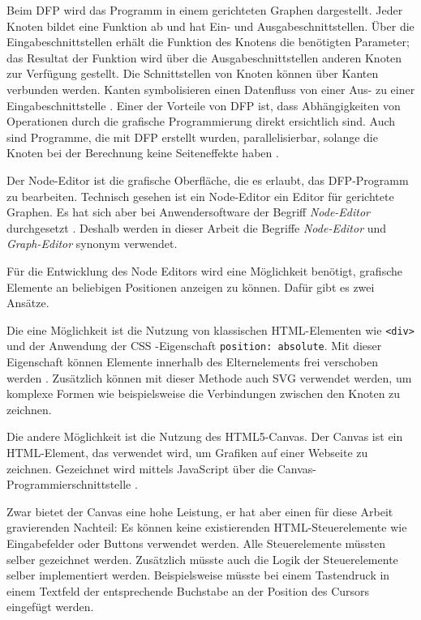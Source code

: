 Beim \ac{DFP} wird das Programm in einem gerichteten Graphen dargestellt. Jeder Knoten bildet eine Funktion ab und hat Ein- und Ausgabeschnittstellen. Über die Eingabeschnittstellen erhält die Funktion des Knotens die benötigten Parameter; das Resultat der Funktion wird über die Ausgabeschnittstellen anderen Knoten zur Verfügung gestellt. Die Schnittstellen von Knoten können über Kanten verbunden werden. Kanten symbolisieren einen Datenfluss von einer Aus- zu einer Eingabeschnittstelle \cite{dataflow}. Einer der Vorteile von \ac{DFP} ist, dass Abhängigkeiten von Operationen durch die grafische Programmierung direkt ersichtlich sind. Auch sind Programme, die mit \ac{DFP} erstellt wurden, parallelisierbar, solange die Knoten bei der Berechnung keine Seiteneffekte haben \cite{dataflow}.

Der Node-Editor ist die grafische Oberfläche, die es erlaubt, das \ac{DFP}-Programm zu bearbeiten. Technisch gesehen ist ein Node-Editor ein Editor für gerichtete Graphen. Es hat sich aber bei Anwendersoftware der Begriff \textit{Node-Editor} durchgesetzt \cite{nodeeditor:blender, nodeeditor:maya}. Deshalb werden in dieser Arbeit die Begriffe \textit{Node-Editor} und \textit{Graph-Editor} synonym verwendet.

Für die Entwicklung des Node Editors wird eine Möglichkeit benötigt, grafische Elemente an beliebigen Positionen anzeigen zu können. Dafür gibt es zwei Ansätze.

Die eine Möglichkeit ist die Nutzung von klassischen \ac{HTML}-Elementen wie \texttt{<div>} und der Anwendung der \ac{CSS}
-Eigenschaft \texttt{position: absolute}. Mit dieser Eigenschaft können Elemente innerhalb des Elternelements frei verschoben werden \cite{mdn:position}. Zusätzlich können mit dieser Methode auch \ac{SVG} verwendet werden, um komplexe Formen wie beispielsweise die Verbindungen zwischen den Knoten zu zeichnen.

Die andere Möglichkeit ist die Nutzung des HTML5-Canvas. Der Canvas ist ein HTML-Element, das verwendet wird, um Grafiken auf einer Webseite zu zeichnen. Gezeichnet wird mittels JavaScript über die Canvas-Programmierschnittstelle \cite{mdn:canvas}.

Zwar bietet der Canvas eine hohe Leistung, er hat aber einen für diese Arbeit gravierenden Nachteil: Es können keine existierenden \ac{HTML}-Steuerelemente wie Eingabefelder oder Buttons verwendet werden. Alle Steuerelemente müssten selber gezeichnet werden. Zusätzlich müsste auch die Logik der Steuerelemente selber implementiert werden. Beispielsweise müsste bei einem Tastendruck in einem Textfeld der entsprechende Buchstabe an der Position des Cursors eingefügt werden.

